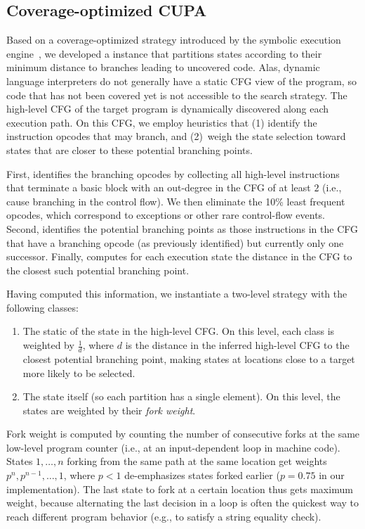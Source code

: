 \subsection{Coverage-optimized CUPA}
\label{sec:chef:cupa-coverage}

Based on a coverage-optimized strategy introduced by the \klee symbolic execution engine~\cite{klee}, we developed a \cupa instance that partitions states according to their minimum distance to branches leading to uncovered code.
%
Alas, dynamic language interpreters do not generally have a static CFG view of the program, so code that has not been covered yet is not accessible to the search strategy.  The high-level CFG of the target program is dynamically discovered along each execution path.  On this CFG, we employ heuristics that (1) identify the instruction opcodes that may branch, and (2)~weigh the state selection toward states that are closer to these potential branching points.

First, \chef identifies the branching opcodes by collecting all high-level instructions that terminate a basic block with an out-degree in the CFG of at least $2$ (i.e., cause branching in the control flow).   We then eliminate the 10\% least frequent opcodes, which correspond to exceptions or other rare control-flow events.
%
Second, \chef identifies the potential branching points as those instructions in the CFG that have a branching opcode (as previously identified) but currently only one successor.
%
Finally, \chef computes for each execution state the distance in the CFG to the closest such potential branching point.

Having computed this information, we instantiate a two-level \cupa strategy with the following classes:
\begin{enumerate}
\item The static \hlpc of the state in the high-level CFG.  On this level, each class is weighted by $\frac{1}{d}$, where $d$ is the distance in the inferred high-level CFG to the closest potential branching point, making states at locations close to a target more likely to be selected.
\item The state itself (so each partition has a single element).  On this level, the states are weighted by their \textit{fork weight}.
\end{enumerate}

Fork weight is computed by counting the number of consecutive forks at the same low-level program counter (i.e., at an input-dependent loop in machine code).  States $1, \ldots, n$ forking from the same path at the same location get weights $p^n, p^{n-1}, \ldots, 1$, where $p < 1$ de-emphasizes states forked earlier ($p = 0.75$ in our implementation).  The last state to fork at a certain location thus gets maximum weight, because alternating the last decision in a loop is often the quickest way to reach different program behavior (e.g., to satisfy a string equality check).


